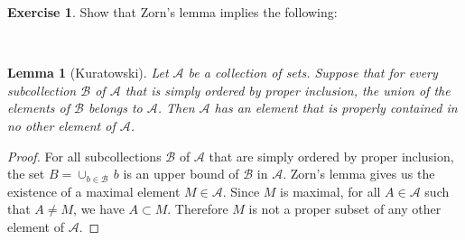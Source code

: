 \documentclass[11pt,a4paper,twoside]{article}
\theoremstyle{definition}
\newcounter{excounter}
\newtheorem{exercise}[excounter]{Exercise}
\theoremstyle{plain}
\newtheorem*{lemma}{Lemma}
\begin{document}
\begin{exercise}

  Show that Zorn's lemma implies the following:

\end{exercise}

~\\
\begin{lemma}[Kuratowski]
  Let $\mathscr{A}$ be a collection of sets. Suppose that for every subcollection
  $\mathscr{B}$ of $\mathscr{A}$ that is simply ordered by proper inclusion, the union of the
  elements of $\mathscr{B}$ belongs to $\mathscr{A}$. Then $\mathscr{A}$ has an element that is
  properly contained in no other element of $\mathscr{A}$.
\end{lemma}

\begin{proof}

  For all subcollections $\mathscr{B}$ of $\mathscr{A}$ that are simply ordered by proper inclusion,
  the set $B = \cup_{b \in \mathscr{B}} \,b$ is an upper bound of $\mathscr{B}$ in $\mathscr{A}$.
  Zorn's lemma gives us the existence of a maximal element $M \in \mathscr{A}$. Since $M$ is maximal,
  for all $A \in \mathscr{A}$ such that $A \neq M$, we have $A \subset M$. Therefore $M$ is not
  a proper subset of any other element of $\mathscr{A}$.

\end{proof}
\end{document}
